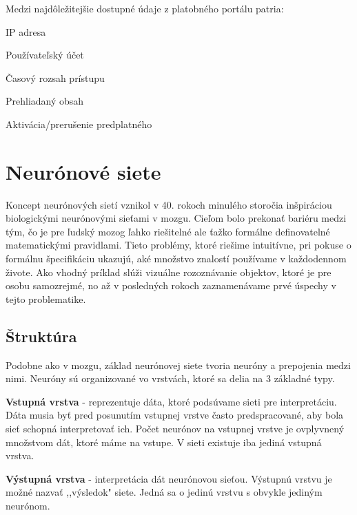 Medzi najdôležitejšie dostupné údaje z platobného portálu patria:

\begin{my_itemize}
	\item {IP adresa}
	\item {Používateľský účet}
	\item {Časový rozsah prístupu}
	\item {Prehliadaný obsah}
	\item {Aktivácia/prerušenie predplatného}
\end{my_itemize}

\section{Neurónové siete}
\label{analyza_neuronove_siete}

Koncept neurónových sietí vznikol v 40. rokoch minulého storočia inšpiráciou biologickými neurónovými sieťami v mozgu. Cieľom bolo prekonať bariéru medzi tým, čo je pre ľudský mozog ľahko riešitelné ale ťažko formálne definovatelné matematickými pravidlami. Tieto problémy, ktoré riešime intuitívne, pri pokuse o formálnu špecifikáciu ukazujú, aké množstvo znalostí používame v každodennom živote. Ako vhodný príklad slúži vizuálne rozoznávanie objektov, ktoré je pre osobu samozrejmé, no až v posledných rokoch zaznamenávame prvé úspechy v tejto problematike.  

\subsection{Štruktúra}
\label{analyza_struktura_nn}

Podobne ako v mozgu, základ neurónovej siete tvoria neuróny a prepojenia medzi nimi. Neuróny sú organizované vo vrstvách, ktoré sa delia na 3 základné typy. 
\noindent

\textbf{Vstupná vrstva} - reprezentuje dáta, ktoré podsúvame sieti pre interpretáciu. Dáta musia byť pred posunutím vstupnej vrstve často predspracované, aby bola sieť schopná interpretovať ich. Počet neurónov na vstupnej vrstve je ovplyvnený množstvom dát, ktoré máme na vstupe. V sieti existuje iba jediná vstupná vrstva.
\noindent

\textbf{Výstupná vrstva} - interpretácia dát neurónovou sieťou. Výstupnú vrstvu je možné nazvať ,,výsledok"  siete. Jedná sa o jedinú vrstvu s obvykle jediným neurónom.  
\noindent

